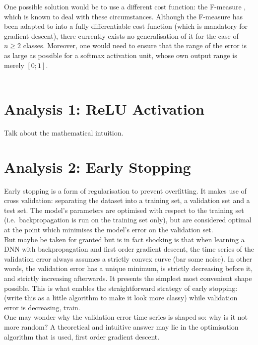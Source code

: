\documentclass[a4paper,11pt]{article}
\begin{document}
One possible solution would be to use a different cost function: the F-measure \cite{f-measure}, which is known to deal with these circumstances. Although the F-measure has been adapted to into a fully differentiable cost function (which is mandatory for gradient descent), there currently exists no generalisation of it for the case of $n \ge 2$
classes. Moreover, one would need to ensure that the range of the error is as large as possible for a softmax activation unit, whose own output range is merely $[0;1]$. \\ \\




\clearpage

\section{Analysis 1: ReLU Activation}

Talk about the mathematical intuition.

\section{Analysis 2: Early Stopping}

Early stopping is a form of regularisation to prevent overfitting. It makes use of cross validation: separating the dataset into a training set, a validation set and a test set. The model's parameters are optimised with respect to the training set (i.e.\ backpropagation is run on the training set only), but are considered optimal at the point which minimises the model's error on the validation set. \\

But maybe be taken for granted but is in fact shocking is that when learning a DNN with backpropagation and first order gradient descent, the time series of the validation error always assumes a strictly convex curve (bar some noise). In other words, the validation error has a unique minimum, is strictly decreasing before it, and strictly increasing afterwards. It presents the simplest most convenient shape possible. This is what enables the straightforward strategy of early stopping: (write this as a little algorithm to make it look more classy) while validation error is decreasing, train. \\

One may wonder why the validation error time series is shaped so: why is it not more random? A theoretical and intuitive answer may lie in the optimisation algorithm that is used, first order gradient descent.
\end{document}
